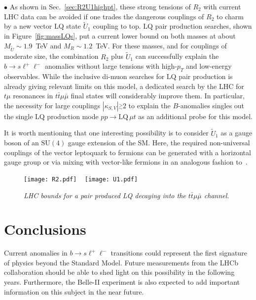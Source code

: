 \documentclass[aps,twocolumn,showpacs,preprintnumbers,amsmath,amssymb,floatfix,nofootinbib]{revtex4-1}
\newcommand{\gsim}{\stackrel{>}{_\sim}}
\begin{document}
$\bullet$ As shown in Sec.~\ref{sec:R2U1highpt}, these strong tensions of $R_2$ with current LHC data can be avoided if one trades the dangerous couplings of $R_2$ to charm by a new vector LQ state $\widetilde U_1$ coupling to top. LQ pair production searches, shown in Figure~\ref{fig:massLQs}, put a current lower bound on both masses at about $M_{\widetilde U}\!\sim\!1.9$~TeV and $M_R\!\sim\!1.2$~TeV. For these masses, and for couplings of moderate size, the combination $R_2$ plus $\widetilde U_1$ can successfully explain the $b \to s \ell^+ \ell^-$ anomalies without large tensions with high-$p_T$ and low-energy observables. While the inclusive di-muon searches for LQ pair production is already giving relevant limits on this model, a dedicated search by the LHC for $t\mu$ resonances in $t\bar t\mu\bar\mu$ final states will considerably improve them. In particular, the necessity for large couplings $|\kappa_{S,V}|\gsim2$ to explain the $B$-anomalies singles out the single LQ production mode $pp\to \mathrm{LQ}\, \mu t$ as an additional probe for this model.

It is worth mentioning that one interesting possibility is to consider $\widetilde{U}_1$ as a gauge boson of an $\mathrm{SU(4)}$ gauge extension of the SM. Here, the required non-universal couplings of the vector leptoquark to fermions can be generated with a horizontal gauge group or via mixing with vector-like fermions in an analogous fashion to~\cite{Assad:2017iib,DiLuzio:2017vat,Calibbi:2017qbu}.     

%
\begin{figure*}[t]
\begin{center}{
\texttt{[image: R2.pdf]}
~
\texttt{[image: U1.pdf]}
\caption{\textit{LHC bounds for a pair produced LQ decaying into the $t\bar t\mu\bar\mu$ channel.} \label{fig:LQpairbounds}     } }
\end{center}
\end{figure*}

\section{Conclusions}  \label{seccon}

Current anomalies in $b \to s \ell^+ \ell^-$ transitions could represent the first signature of physics beyond the Standard Model.  Future measurements from the LHCb collaboration should be able to shed light on this possibility in the following years. Furthermore, the Belle-II experiment is also expected to add important information on this subject in the near future.     
\end{document}
